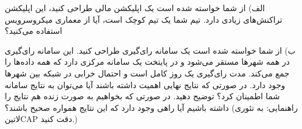 \documentclass[../main.tex]{subfiles}
\begin{document}

الف) از شما خواسته شده است یک اپلیکشن مالی طراحی کنید، این اپلیکشن تراکنش‌های زیادی دارد. تیم شما یک تیم کوچک است، آیا از معماری میکروسرویس استفاده می‌کنید؟

ب) از شما خواسته شده است یک سامانه رای‌گیری طراحی کنید. این سامانه رای‌گیری در همه شهرها مستقر می‌شود و در پایتخت یک سامانه مرکزی دارد که همه داده‌ها را جمع می‌کند. مدت رای‌گیری یک روز کامل است و احتمال خرابی در شبکه بین شهرها وجود دارد. در صورتی که نتایج نهایی اهمیت داشته باشند آیا می‌توان به نتایج سامانه شما اطمینان کرد؟ توضیح دهید. در صورتی که بخواهیم به صورت زنده هم نتایج را داشته باشیم آیا راهی وجود دارد که این نتایج همواره صحیح باشند؟ (راهنمایی: به تئوری ‌لاتین{CAP} دقت کنید.)
\end{document}
